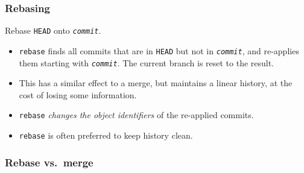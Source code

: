 \documentclass{beamer}
\begin{document}
\begin{frame}
  \frametitle{Rebasing}
  \begin{description}
  \item[\texttt{git rebase \textit{commit}}] Rebase \texttt{HEAD} onto
    \texttt{\textit{commit}}.
  \end{description}

  \begin{itemize}
  \item \texttt{rebase} finds all commits that are in \texttt{HEAD}
    but not in \texttt{\textit{commit}}, and re-applies them starting
    with \texttt{\textit{commit}}. The current branch is reset to the
    result.
  \item This has a similar effect to a merge, but maintains a linear
    history, at the cost of losing some information.
  \item \texttt{rebase} \emph{changes the object identifiers} of the
    re-applied commits.
  \item \texttt{rebase} is often preferred to keep history clean.
  \end{itemize}
\end{frame}

\begin{frame}
  \frametitle{Rebase vs.\ merge}
  \begin{itemize}
  \end{itemize}
    \begin{center}
  \end{center}
\end{frame}
\end{document}
